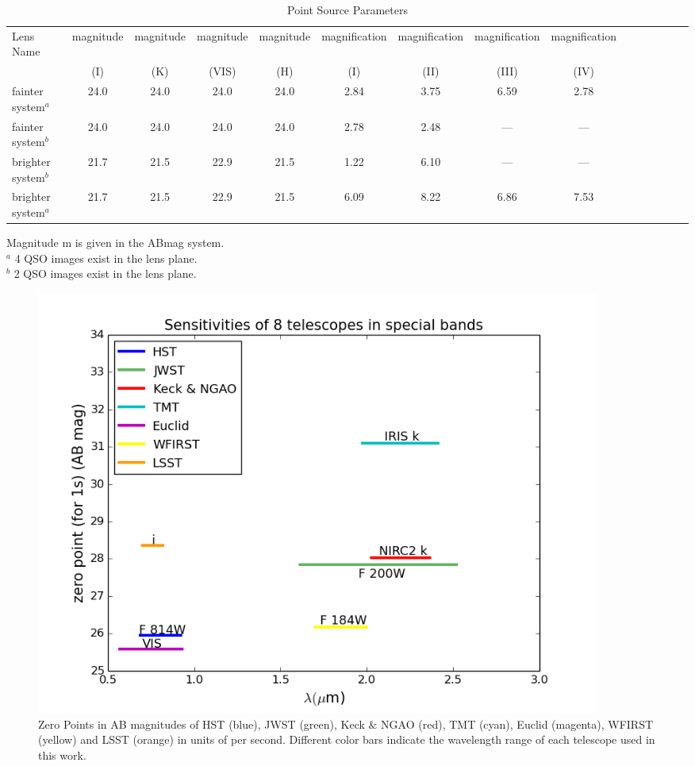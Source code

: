 \documentclass[a4paper,11pt]{article}
\begin{document}
\begin{table}\footnotesize
\begin{center}
\caption{Point Source Parameters}
\begin{tabular}{lcccccccccccccc|}
\hline \hline
Lens Name & magnitude & magnitude & magnitude & magnitude & magnification & magnification & magnification & magnification\\
&  (I) &  (K) &  (VIS) & (H) & (I) & (II) & (III) & (IV) \\
\hline
fainter system$^a$   &24.0  &   24.0 &  24.0 &  24.0 &  2.84 &  3.75 & 6.59 & 2.78  \\
fainter system$^b$   &24.0  &  24.0  &  24.0 &  24.0 &  2.78 &  2.48 &  ---   &  ---\\
brighter system$^b$ &21.7  &  21.5 &  22.9  & 21.5  & 1.22  & 6.10  & ---   &  ---\\
brighter system$^a$ &21.7  &  21.5 & 22.9  &  21.5  & 6.09  & 8.22 & 6.86  & 7.53\\
\hline
\hline
\end{tabular}
\begin{tablenotes}
\item 
Magnitude m is given in the ABmag system.\\
$^a$ 4 QSO images exist in the lens plane. \\
$^b$ 2 QSO images exist in the lens plane. \\
\end{tablenotes}
\end{center}
\end{table}


\begin{figure}
\begin{center}
\includegraphics[width=0.9\textwidth]{figures/wavelength_zp.png}
\end{center}
\caption{Zero Points in AB magnitudes of HST (blue), JWST (green), Keck $\&$ NGAO (red), TMT (cyan), Euclid (magenta), WFIRST (yellow) and LSST (orange) in units of per second. Different color bars indicate the wavelength range of each telescope used in this work.}
\label{fig:zp_wavelength}
\end{figure}
\end{document}
